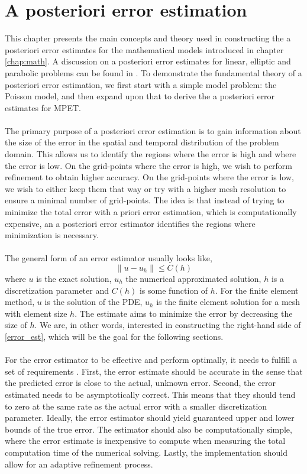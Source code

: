 \chapter{A posteriori error estimation}
\label{chap:error}
This chapter presents the main concepts and theory used in constructing the a posteriori error estimates for the mathematical models introduced in chapter \ref{chap:math}. A discussion on a posteriori error estimates for linear, elliptic and parabolic problems can be found in \cite{ainsworth, verfurth92, bangerth, babuska78b}. To demonstrate the fundamental theory of a posteriori error estimation, we first start with a simple model problem: the Poisson model, and then expand upon that to derive the a posteriori error estimates for MPET.
\\
\\
The primary purpose of a posteriori error estimation is to gain information about the size of the error in the spatial and temporal distribution of the problem domain. This allows us to identify the regions where the error is high and where the error is low. On the grid-points where the error is high, we wish to perform refinement to obtain higher accuracy. On the grid-points where the error is low, we wish to either keep them that way or try with a higher mesh resolution to ensure a minimal number of grid-points. The idea is that instead of trying to minimize the total error with a priori error estimation, which is computationally expensive, an a posteriori error estimator identifies the regions where minimization is necessary.
\\
\\
The general form of an error estimator usually looks like, 
\begin{equation} \label{error_est}
\|u - u_h \| \leq C(h)
\end{equation}
where $u$ is the exact solution, $u_h$ the numerical approximated solution, $h$ is a discretization parameter and $C(h)$ is some function of $h$. For the finite element method, $u$ is the solution of the PDE, $u_h$ is the finite element solution for a mesh with element size $h$. The estimate aims to minimize the error by decreasing the size of $h$. 
We are, in other words, interested in constructing the right-hand side of \eqref{error_est}, which will be the goal for the following sections. 
\\
\\
For the error estimator to be effective and perform optimally, it needs to fulfill a set of requirements \cite{verfurth92}. First, the error estimate should be accurate in the sense that the predicted error is close to the actual, unknown error. Second, the error estimated needs to be asymptotically correct. This means that they should tend to zero at the same rate as the actual error with a smaller discretization parameter. Ideally, the error estimator should yield guaranteed upper and lower bounds of the true error. The estimator should also be computationally simple, where the error estimate is inexpensive to compute when measuring the total computation time of the numerical solving. Lastly, the implementation should allow for an adaptive refinement process. 

